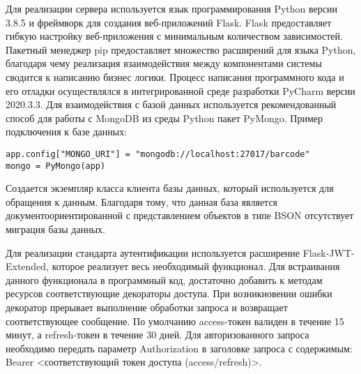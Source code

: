 Для реализации сервера используется язык программирования Python версии 3.8.5 и фреймворк для создания веб-приложений
Flask\cite{4}. Flask предоставляет гибкую настройку веб-приложения с минимальным количеством зависимостей. Пакетный менеджер pip предоставляет множество расширений для языка Python, благодаря чему реализация взаимодействия между компонентами системы сводится к написанию бизнес логики. Процесс написания программного кода и его отладки осуществлялся в интегрированной среде разработки PyCharm версии 2020.3.3. Для взаимодействия с базой данных используется рекомендованный способ для работы с MongoDB из среды Python пакет PyMongo\cite{5}. Пример подключения к базе данных:
\begin{lstlisting}
app.config["MONGO_URI"] = "mongodb://localhost:27017/barcode"
mongo = PyMongo(app)
\end{lstlisting}

Создается экземпляр класса клиента базы данных, который используется для обращения к данным. Благодаря тому, что данная база является документоориентированной с представлением объектов в типе BSON отсутствует миграция базы данных.

Для реализации стандарта аутентификации используется расширение
Flask-JWT-Extended\cite{6}, которое реализует весь необходимый функционал. Для встраивания данного функционала в программный код, достаточно добавить к методам ресурсов соответствующие декораторы доступа. При возникновении ошибки декоратор прерывает выполнение обработки запроса и возвращает соответствующее сообщение. По умолчанию access-токен валиден в течение 15 минут, а refresh-токен в течение 30 дней. Для авторизованного запроса необходимо передать параметр Authorization в заголовке запроса с содержимым: Bearer <соответствующий токен доступа (access/refresh)>.




\clearpage